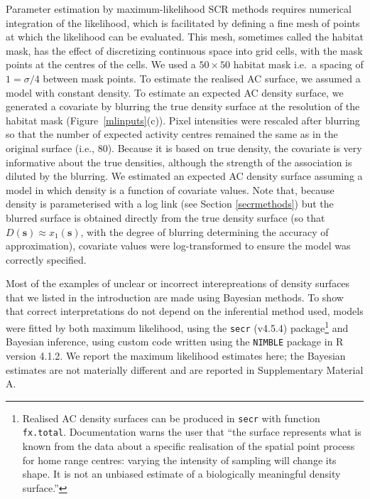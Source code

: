 \documentclass[useAMS,usenatbib,referee]{biom}
\begin{document}
Parameter estimation by maximum-likelihood SCR methods requires numerical integration of the likelihood, which is facilitated by defining a fine mesh of points at which the likelihood can be evaluated. This mesh, sometimes called the habitat mask, has the effect of discretizing continuous space into grid cells, with the mask points at the centres of the cells. We used a $50\times 50$ habitat mask i.e.\, a spacing of $1=\sigma/4$ between mask points. To estimate the realised AC surface, we assumed a model with constant density. To estimate an expected AC density surface, we generated a covariate by blurring the true density surface at the resolution of the habitat mask (Figure~\ref{mlinputs}(c)). Pixel intensities were rescaled after blurring so that the number of expected activity centres remained the same as in the original surface (i.e., 80). Because it is based on true density, the covariate is very informative about the true densities, although the strength of the association is diluted by the blurring. We estimated an expected AC density surface assuming a model in which density is a function of covariate values. Note that, because density is parameterised with a log link (see Section \ref{secrmethods}) but the blurred surface is obtained directly from the true density surface (so that $D(\mathbf{s})\approx x_1(\mathbf{s})$, with the degree of blurring determining the accuracy of approximation), covariate values were log-transformed to ensure the model was correctly specified.%

Most of the examples of unclear or incorrect interepreations of density surfaces that we listed in the introduction are made using Bayesian methods. To show that correct interpretations do not depend on the inferential method used, models were fitted by both maximum likelihood, using the \texttt{secr} (v4.5.4) package\footnote{Realised AC density surfaces can be produced in \texttt{secr} with function \texttt{fx.total}. Documentation warns the user that ``the surface represents what is known from the data about a specific realisation of the spatial point process for home range centres: varying the intensity of sampling will change its shape. It is not an unbiased estimate of a biologically meaningful density surface.''} \citep{secr:21} and Bayesian inference, using custom code written using the \texttt{NIMBLE} package \citep{deValpine:17, Turek:21} in R version 4.1.2. We report the maximum likelihood estimates here; the Bayesian estimates are not materially different and are reported in Supplementary Material A.
\end{document}
